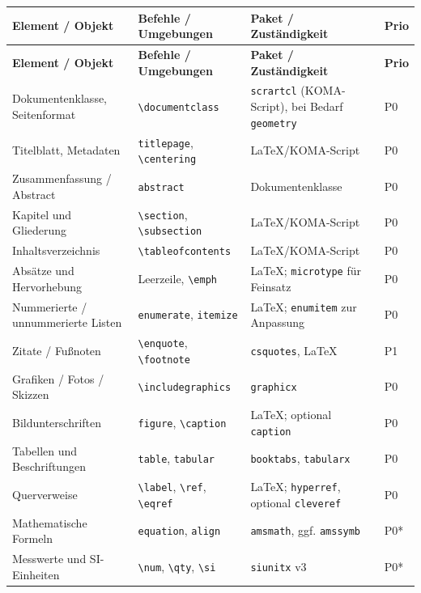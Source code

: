 \documentclass[11pt,a4paper,parskip=half]{scrartcl} %
\newcommand{\pkg}[1]{\texttt{#1}}
\begin{document}
{\footnotesize
\setlength{\tabcolsep}{4pt}
\setlength{\LTpre}{4pt}\setlength{\LTpost}{8pt}
\begin{longtable}{@{}p{.24\linewidth}p{.30\linewidth}p{.28\linewidth}p{.08\linewidth}@{}}
\toprule
\textbf{Element / Objekt} & \textbf{Befehle / Umgebungen} & \textbf{Paket / Zuständigkeit} & \textbf{Prio}\\
\midrule\endfirsthead
\toprule
\textbf{Element / Objekt} & \textbf{Befehle / Umgebungen} & \textbf{Paket / Zuständigkeit} & \textbf{Prio}\\
\midrule\endhead
Dokumentenklasse, Seitenformat & \texttt{\textbackslash documentclass} & \pkg{scrartcl} (KOMA-Script), bei Bedarf \pkg{geometry} & P0\\
Titelblatt, Metadaten & \texttt{titlepage}, \texttt{\textbackslash centering} & LaTeX/KOMA-Script & P0\\
Zusammenfassung / Abstract & \texttt{abstract} & Dokumentenklasse & P0\\
Kapitel und Gliederung & \texttt{\textbackslash section}, \texttt{\textbackslash subsection} & LaTeX/KOMA-Script & P0\\
Inhaltsverzeichnis & \texttt{\textbackslash tableofcontents} & LaTeX/KOMA-Script & P0\\
Absätze und Hervorhebung & Leerzeile, \texttt{\textbackslash emph} & LaTeX; \pkg{microtype} für Feinsatz & P0\\
Nummerierte / unnummerierte Listen & \texttt{enumerate}, \texttt{itemize} & LaTeX; \pkg{enumitem} zur Anpassung & P0\\
Zitate / Fußnoten & \texttt{\textbackslash enquote}, \texttt{\textbackslash footnote} & \pkg{csquotes}, LaTeX & P1\\
Grafiken / Fotos / Skizzen & \texttt{\textbackslash includegraphics} & \pkg{graphicx} & P0\\
Bildunterschriften & \texttt{figure}, \texttt{\textbackslash caption} & LaTeX; optional \pkg{caption} & P0\\
Tabellen und Beschriftungen & \texttt{table}, \texttt{tabular} & \pkg{booktabs}, \pkg{tabularx} & P0\\
Querverweise & \texttt{\textbackslash label}, \texttt{\textbackslash ref}, \texttt{\textbackslash eqref} & LaTeX; \pkg{hyperref}, optional \pkg{cleveref} & P0\\
Mathematische Formeln & \texttt{equation}, \texttt{align} & \pkg{amsmath}, ggf. \pkg{amssymb} & P0*\\
Messwerte und SI-Einheiten & \texttt{\textbackslash num}, \texttt{\textbackslash qty}, \texttt{\textbackslash si} & \pkg{siunitx} v3 & P0*\\

\end{longtable}}
\end{document}
